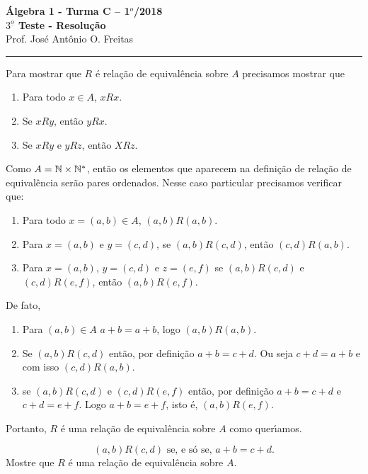 \documentclass[12pt]{article}
\begin{document}


\begin{center}
{\Large\bf {\'A}lgebra 1 - Turma C -- 1$^{o}$/2018} \\ \vspace{9pt} {\large\bf
  $3^{\underline{o}}$ Teste - Resolu\c{c}\~ao}\\
\vspace{9pt} Prof. Jos{\'e} Ant{\^o}nio O. Freitas
\end{center}
\hrule

\vspace{.6cm}

\questao Para mostrar que $R$ \'e rela\c{c}\~ao de equival\^encia sobre $A$ precisamos mostrar que
\begin{enumerate}
	\item Para todo $x \in A$, $xRx$.
	\item Se $xRy$, ent\~ao $yRx$.
	\item Se $xRy$ e $yRz$, ent\~ao $XRz$.
\end{enumerate}

Como $A = \mathbb{N} \times \mathbb{N}^*$, ent\~ao os elementos que aparecem na defini\c{c}\~ao de rela\c{c}\~ao de equival\^encia ser\~ao pares ordenados. Nesse caso particular precisamos verificar que:
\begin{enumerate}
	\item Para todo $x = (a,b) \in A$, $(a,b)R(a,b)$.
	\item Para $x = (a,b)$ e $y = (c,d)$, se $(a,b)R(c,d)$, ent\~ao $(c,d)R(a,b)$.
	\item Para $x = (a,b)$, $y = (c,d)$ e $z = (e,f)$ se $(a,b)R(c,d)$ e $(c,d)R(e,f)$, ent\~ao $(a,b)R(e,f)$.
\end{enumerate}

De fato,
\begin{enumerate}
	\item Para $(a,b) \in A$ $a + b = a + b$, logo $(a,b)R(a,b)$.
	\item Se $(a,b)R(c,d)$ ent\~ao, por defini\c{c}\~ao $a + b = c + d$. Ou seja $c + d = a + b$ e com isso $(c,d)R(a,b)$.
	\item se $(a,b)R(c,d)$ e $(c,d)R(e,f)$ ent\~ao, por defini\c{c}\~ao $a + b = c + d$  e $c + d = e + f$. Logo $a + b = e + f$, isto \'e, $(a,b)R(e,f)$.
\end{enumerate}

Portanto, $R$ \'e uma rela\c{c}\~ao de equival\^encia sobre $A$ como quer{\'\i}amos.

\[
	(a,b)R(c,d) \mbox{ se, e s\'o se, } a + b = c + d.
\]
Mostre que $R$ \'e uma rela\c{c}\~ao de equival\^encia sobre $A$.
\end{document}

